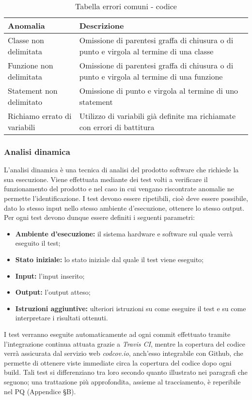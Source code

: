 \documentclass[../NormediProgetto.tex]{subfiles}
\begin{document}
\begin{longtable}{| p{5cm} |p{8cm} |}
	\caption {Tabella errori comuni - codice} \\
	\hline  
	\textbf{Anomalia} & \textbf{Descrizione}  \\ 
	\hline 
	Classe non delimitata & Omissione di parentesi graffa di chiusura o di punto e virgola al termine di una classe \\ 
	\hline 
	Funzione non delimitata & Omissione di parentesi graffa di chiusura o di punto e virgola al termine di una funzione  \\ 
	\hline 
	Statement non delimitato & Omissione di punto e virgola al termine di uno statement \\ 
	\hline 
	Richiamo errato di variabili & Utilizzo di variabili già definite ma richiamate con errori di
	battitura  \\ 
	\hline 
\end{longtable} 

\subsubsection{Analisi dinamica}

L’analisi dinamica è una tecnica di analisi del prodotto software che richiede la sua esecuzione. Viene effettuata mediante dei test volti a verificare il funzionamento del prodotto e nel caso in cui vengano riscontrate anomalie ne permette l’identificazione. I test devono essere ripetibili, cioè deve essere possibile, dato lo stesso input nello stesso ambiente d'esecuzione, ottenere lo stesso output. Per ogni test devono dunque essere definiti i seguenti parametri:

\begin{itemize}
	\item \textbf{Ambiente d'esecuzione:} il sistema hardware e software sul quale verrà eseguito il test;
	\item \textbf{Stato iniziale:} lo stato iniziale dal quale il test viene eseguito;
	\item \textbf{Input:} l’input inserito;
	\item \textbf{Output:} l’output atteso;
	\item \textbf{Istruzioni aggiuntive:} ulteriori istruzioni su come eseguire il test e su come interpretare i risultati ottenuti.
\end{itemize}

I test verranno eseguite automaticamente ad ogni commit effettuato tramite l'integrazione continua attuata grazie a \textit{Travis CI}, mentre la copertura del codice verrà assicurata dal servizio web \textit{codcov.io}, anch'esso integrabile con Github, che permette di ottenere viste immediate circa la copertura del codice dopo ogni build. Tali test si differenziano tra loro secondo quanto illustrato nei paragrafi che seguono; una
trattazione più approfondita, assieme al tracciamento, è reperibile nel PQ (Appendice §B).
\end{document}
